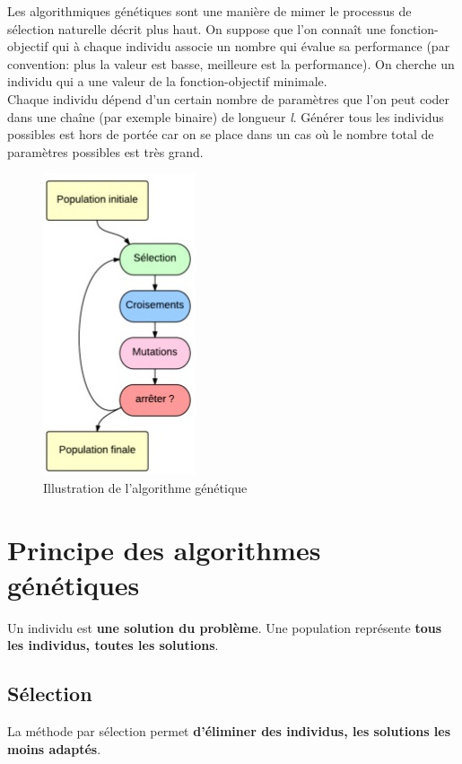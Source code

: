 \documentclass[a4paper,10pt]{report}
\begin{document}
Les algorithmiques génétiques sont une manière de mimer le processus de sélection naturelle décrit plus haut. On suppose que
l'on connaît une fonction-objectif qui à chaque individu associe un nombre qui évalue sa performance (par convention: plus 
la valeur est basse, meilleure est la performance). On cherche un individu qui a une valeur de la fonction-objectif minimale. \\
Chaque individu dépend d'un certain nombre de paramètres que l'on peut coder dans une chaîne (par exemple binaire) de longueur
\textit{l}. Générer tous les individus possibles est hors de portée car on se place dans un cas où le nombre total
de paramètres possibles est très grand.

\begin{figure}
\includegraphics[scale=0.74]{img/algo-genetic}
\caption{Illustration de l'algorithme génétique}
\end{figure}

\chapter*{Principe des algorithmes génétiques}

Un individu est \textbf{une solution du problème}. Une population représente \textbf{tous les individus, toutes les solutions}.


\section*{Sélection}

La méthode par sélection permet \textbf{d'éliminer des individus, les solutions les moins adaptés}.
\end{document}

